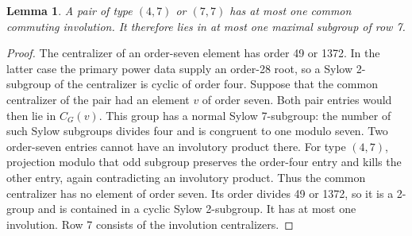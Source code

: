 \documentclass[11pt,a4paper]{article}
\newtheorem{lemma}{Lemma}\newtheorem{theorem}{Theorem}
\begin{document}
\begin{lemma}\label{atmost}
A pair of type $(4,7)$ or $(7,7)$ has at most one common commuting
involution. It therefore lies in at most one maximal subgroup of row 7.
\end{lemma}
\begin{proof}
The centralizer of an order-seven element has order 49 or 1372.
In the latter case the primary power data supply an order-28 root,
so a Sylow 2-subgroup of the centralizer is cyclic of order four.
Suppose that the common centralizer of the pair had an element $v$
of order seven. Both pair entries would then lie in $C_G(v)$.
This group has a normal Sylow 7-subgroup: the number of such Sylow
subgroups divides four and is congruent to one modulo seven.
Two order-seven entries cannot have an involutory product there.
For type $(4,7)$, projection modulo that odd subgroup preserves the
order-four entry and kills the other entry, again contradicting an
involutory product. Thus the common centralizer has no element of
order seven. Its order divides 49 or 1372, so it is a 2-group and
is contained in a cyclic Sylow 2-subgroup. It has at most one
involution. Row 7 consists of the involution centralizers.
\end{proof}
\end{document}

